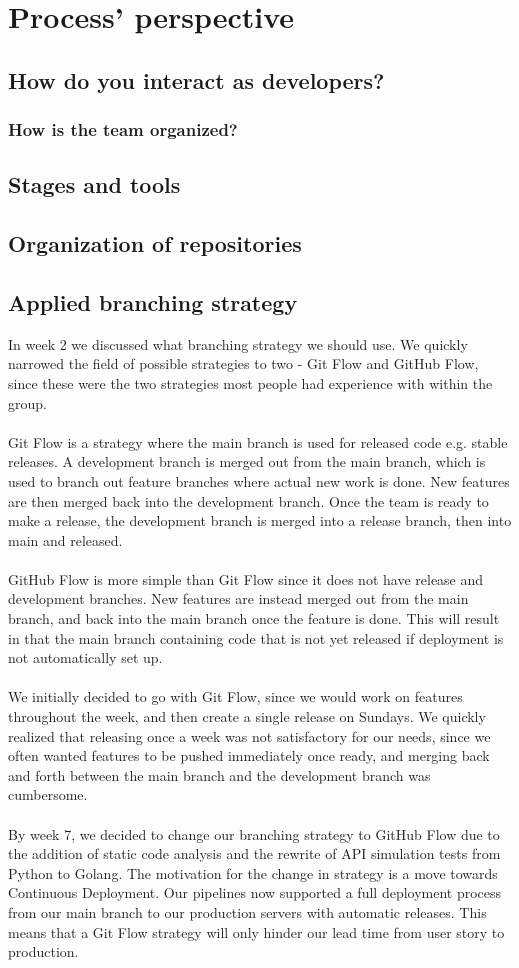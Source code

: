 \section{Process' perspective}
\subsection{How do you interact as developers?}
\subsubsection{How is the team organized?}
\subsection{Stages and tools}
\subsection{Organization of repositories}
\subsection{Applied branching strategy}
In week 2 we discussed what branching strategy we should use. We quickly narrowed the field of possible strategies to two - Git Flow and GitHub Flow, since these were the two strategies most people had experience with within the group. 
\\\\
Git Flow is a strategy where the main branch is used for released code e.g. stable releases. A development branch is merged out from the main branch, which is used to branch out feature branches where actual new work is done. New features are then merged back into the development branch. Once the team is ready to make a release, the development branch is merged into a release branch, then into main and released.
\\\\
GitHub Flow is more simple than Git Flow since it does not have release and development branches. New features are instead merged out from the main branch, and back into the main branch once the feature is done. This will result in that the main branch containing code that is not yet released if deployment is not automatically set up.
\\\\
We initially decided to go with Git Flow, since we would work on features throughout the week, and then create a single release on Sundays. We quickly realized that releasing once a week was not satisfactory for our needs, since we often wanted features to be pushed immediately once ready, and merging back and forth between the main branch and the development branch was cumbersome.
\\\\
By week 7, we decided to change our branching strategy to GitHub Flow due to the addition of static code analysis and the rewrite of API simulation tests from Python to Golang. The motivation for the change in strategy is a move towards Continuous Deployment. Our pipelines now supported a full deployment process from our main branch to our production servers with automatic releases. This means that a Git Flow strategy will only hinder our lead time from user story to production.